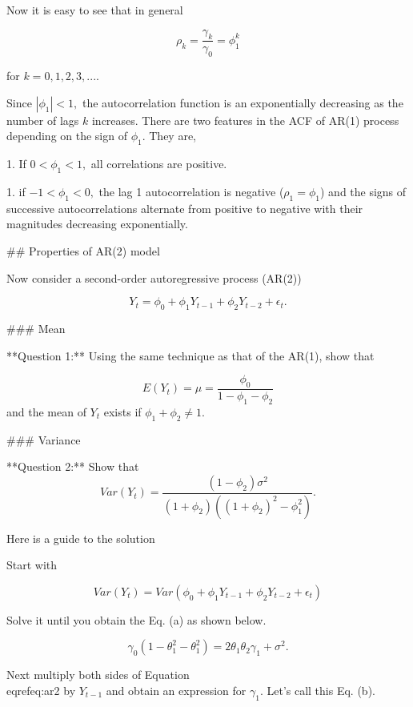 \documentclass[11pt,a4paper,]{article}
\begin{document}
{Now it is easy to see that in general 

\begin{equation}
\label{eq:acfar1}
\rho_k = \frac{\gamma_k}{\gamma_0}=\phi_1^k 
\end{equation}

for $k=0, 1, 2, 3, ...$.

Since $|\phi_1| < 1,$ the autocorrelation function is an exponentially decreasing as the number of lags $k$ increases. There are two features in the ACF of AR(1) process depending on the sign of $\phi_1$. They are,

1. If $0 < \phi_1 < 1,$ all correlations are positive.

1. if $-1 < \phi_1 < 0,$ the lag 1 autocorrelation is negative ($\rho_1=\phi_1$) and the signs of successive autocorrelations alternate from positive to negative with their magnitudes decreasing exponentially. 


## Properties of AR(2) model

Now consider a second-order autoregressive process (AR(2)) 

\begin{equation}
  \label{eq:ar2}
Y_t=\phi_0+\phi_1Y_{t-1}+\phi_2Y_{t-2}+\epsilon_t.
\end{equation}

### Mean


**Question 1:** Using the same technique as that of the AR(1), show that 

$$E(Y_t) = \mu = \frac{\phi_0}{1-\phi_1 - \phi_2}$$ and the mean of $Y_t$ exists if $\phi_1 + \phi_2 \neq 1$.

### Variance

**Question 2:** Show that $$Var(Y_t) = \frac{(1-\phi_2)\sigma^2}{(1+\phi_2)((1+\phi_2)^2-\phi_1^2)}.$$

Here is a guide to the solution

Start with

$$Var(Y_t)=Var(\phi_0+\phi_1Y_{t-1}+\phi_2Y_{t-2}+\epsilon_t)$$

Solve it until you obtain the Eq. (a) as shown below.

\begin{equation}
\tag{a}
\gamma_0 (1-\theta_1^2 - \theta_1^2) = 2\theta_1\theta_2\gamma_1+\sigma^2.
\end{equation}

Next multiply both sides of Equation \\eqref{eq:ar2} by $Y_{t-1}$ and obtain an expression for $\gamma_1$. Let's call this Eq. (b).

}
\end{document}
